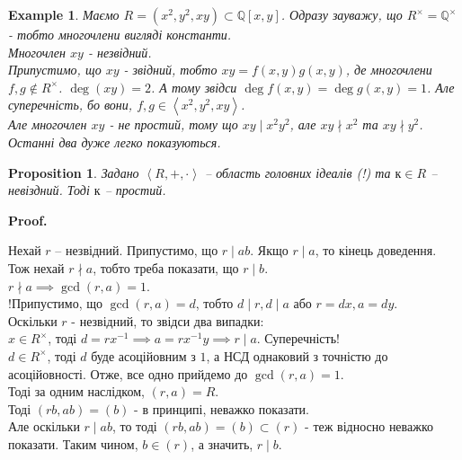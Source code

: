 \documentclass[a4paper, 10pt]{article}
\makeatletter
\theoremstyle{theoremdd}
\theoremstyle{theoremdd}
\theoremstyle{theoremdd}
\theoremstyle{theoremdd}
\theoremstyle{theoremdd}
\newtheorem{example}[theorem]{Example}
\theoremstyle{theoremdd}
\theoremstyle{theoremdd}
\theoremstyle{theoremdd}
\theoremstyle{theoremdd}
\newtheorem{proposition}[theorem]{Proposition}
\theoremstyle{theoremdd}
\theoremstyle{theoremdd}
\newtheorem{remark}[theorem]{Remark}
\theoremstyle{theoremdd}
\theoremstyle{theoremdd}
\theoremstyle{theoremdd}
\theoremstyle{theoremdd}
\renewenvironment{proof}[1][Proof.\\]{\par
\pushQED{\hfill \qed}%
\normalfont \topsep6\p@\@plus6\p@\relax
\trivlist
\item\relax
{\bfseries
#1\@addpunct{.}}\hspace\labelsep\ignorespaces
}{%
\popQED\endtrivlist\@endpefalse
}
\makeatother
\begin{document}
\begin{example}
Маємо $R = \left(x^2,y^2,xy \right) \subset \mathbb{Q}[x,y]$. Одразу зауважу, що $R^\times = \mathbb{Q}^\times$ - тобто многочлени вигляді константи.\\
Многочлен $xy$ - незвідний.\\
Припустимо, що $xy$ - звідний, тобто $xy = f(x,y)g(x,y)$, де многочлени $f,g \not\in R^\times$. $\deg (xy) = 2$. А тому звідси $\deg f(x,y) = \deg g(x,y) = 1$. Але суперечність, бо вони, $f,g \in \left< x^2,y^2, xy\right>$.\\
Але многочлен $xy$ - не простий, тому що $xy \mid x^2y^2$, але $xy \nmid x^2$ та $xy \nmid y^2$. Останні два дуже легко показуються.
\end{example}

\begin{proposition}
Задано $\left<R,+,\cdot \right>$ -- область головних ідеалів (!) та $к \in R$ -- невіздний. Тоді $к$ -- простий.
\end{proposition}

\begin{proof}
Нехай $r$ -- незвідний. Припустимо, що $r \mid ab$. Якщо $r \mid a$, то кінець доведення.\\ Тож нехай $r \nmid a$, тобто треба показати, що $r \mid b$.\\
$r \nmid a \implies \gcd (r,a) = 1$.\\
!Припустимо, що $\gcd(r,a) = d$, тобто $d \mid r, d \mid a$ або $r = dx, a = dy$.\\
Оскільки $r$ - незвідний, то звідси два випадки:\\
$x \in R^\times$, тоді $d = rx^{-1} \implies a = rx^{-1}y \implies r \mid a$. Суперечність!\\
$d \in R^\times$, тоді $d$ буде асоційовним з $1$, а НСД однаковий з точністю до асоційовності. Отже, все одно прийдемо до $\gcd(r,a) = 1$.\\
Тоді за одним наслідком, $(r,a) = R$.\\
Тоді $(rb,ab) = (b)$ - в принципі, неважко показати.\\
Але оскільки $r \mid ab$, то тоді $(rb,ab) = (b) \subset (r)$ - теж відносно неважко показати. Таким чином, $b \in (r)$, а значить, $r \mid b$.
\end{proof}

\iffalse
\begin{remark}
Інтуїтивна різниця між незвідним та простим.\\
$r \in R$ незвідний, тобто його не скоротиш на елемент не з $R^\times$.\\
$r \in R$ простий, тобто ділиться на самого себе помножений на елемент з $R^\times$, або просто на елемент з $R^\times$.
\end{remark}
\fi
\end{document}
